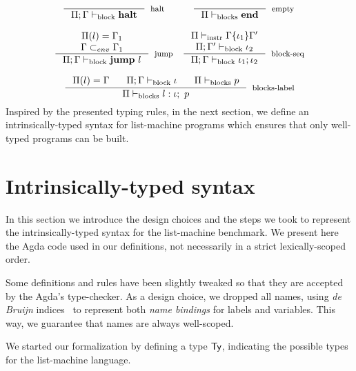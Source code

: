 \documentclass[review]{elsarticle}
\theoremstyle{definition}
\newcommand{\D}[1]{\blue{\mathsf{#1}}}
\begin{document}
\[
\begin{array}{cc}
   \inference{}
             {\Pi;\Gamma\vdash_{\text{block}} \textbf{halt}}[halt]
   &
   \inference{}
             {\Pi\vdash_{\text{blocks}} \textbf{end}}[empty]\\ \\

   \inference{\Pi(l)=\Gamma_1\\ \Gamma \subset_{env} \Gamma_1}
             {\Pi;\Gamma\vdash_{\text{block}} \textbf{jump}~l}[jump]

   &

   \inference{\Pi\vdash_{\text{instr}} \Gamma\{\iota_1\}\Gamma'\\ \Pi;\Gamma'\vdash_{\text{block}} \iota_2}
             {\Pi;\Gamma\vdash_{\text{block}} \iota_1;\iota_2}[block-seq]
 \\ \\

   \multicolumn{2}{c}{
   \inference{\Pi(l)=\Gamma\:\:\:\:\:\:\:\:\Pi;\Gamma\vdash_{\text{block}} \iota\:\:\:\:\:\:\:\:\Pi\vdash_{\text{blocks}} p}
     {\Pi\vdash_{\text{blocks}} l: \iota;~p}[blocks-label]
    }
\end{array}
\]
Inspired by the presented typing rules, in the next section, we define an
intrinsically-typed syntax for list-machine programs which ensures that
only well-typed programs can be built.

\section{Intrinsically-typed syntax}\label{sec:typing}


In this section we introduce the design choices and the steps we took to represent the
intrinsically-typed syntax for the list-machine benchmark. We present here the Agda
code used in our definitions, not necessarily in a strict lexically-scoped order.

Some definitions and rules have been slightly tweaked so that they are accepted by
the Agda's type-checker. As a design choice, we dropped all names, using
\emph{de Bruijn} indices~\cite{DEBRUIJN72} to represent both \emph{name bindings}
for labels and variables. This way, we guarantee that names are always well-scoped.

We started our formalization by defining a type \ensuremath{\D{Ty}}, indicating the possible types
for the list-machine language.
\end{document}
